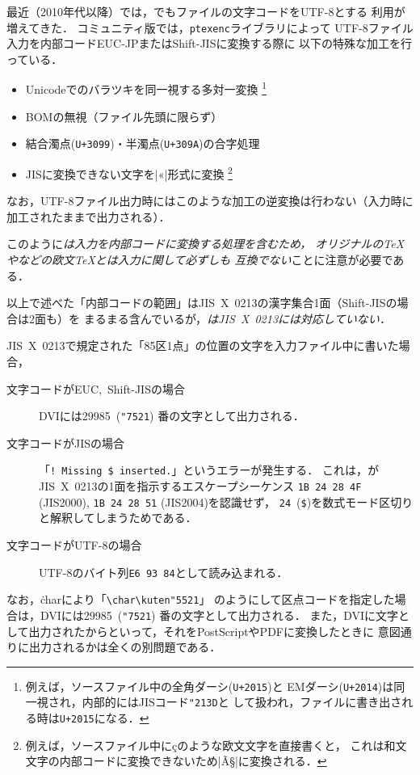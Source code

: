 \documentclass[a4paper,11pt,nomag,dvipdfmx]{jsarticle}
\def\code#1{\texttt{#1}}
\begin{document}
最近（2010年代以降）では，\pTeX でもファイルの文字コードをUTF-8とする
利用が増えてきた．
コミュニティ版\pTeX では，\code{ptexenc}ライブラリによって
UTF-8ファイル入力を内部コードEUC-JPまたはShift-JISに変換する際に
以下の特殊な加工を行っている．
\begin{itemize}
 \item Unicodeでのバラツキを同一視する多対一変換
  \footnote{例えば，ソースファイル中の全角ダーシ(\code{U+2015})と
  EMダーシ(\code{U+2014})は同一視され，内部的にはJISコード\code{"213D}と
  して扱われ，ファイルに書き出される時は\code{U+2015}になる．}
 \item BOMの無視（ファイル先頭に限らず）
 \item 結合濁点(\code{U+3099})・半濁点(\code{U+309A})の合字処理
 \item JISに変換できない文字を|^^ab|形式に変換
  \footnote{例えば，ソースファイル中にçのような欧文文字を直接書くと，
  これは和文文字の内部コードに変換できないため|^^c3^^a7|に変換される．}
\end{itemize}
なお，UTF-8ファイル出力時にはこのような加工の逆変換は行わない（入力時に
加工されたままで出力される）．

このように\emph{\pTeX は入力を内部コードに変換する処理を含むため，
オリジナルの\TeX や\pdfTeX などの欧文\TeX とは入力に関して必ずしも
互換でない}ことに注意が必要である．

\begin{dangerous}
 以上で述べた「内部コードの範囲」はJIS~X~0213の漢字集合1面（Shift-JISの場合は2面も）を
 まるまる含んでいるが，\emph{\pTeX はJIS~X~0213には対応していない．}

 JIS~X~0213で規定された「85区1点」の位置の文字を入力ファイル中に書いた場合，
 \begin{description}
  \item[文字コードがEUC,~Shift-JISの場合] DVIには29985~(\texttt{"7521})%
    番の文字として出力される．
  \item[文字コードがJISの場合] 「\verb+! Missing $ inserted.+」というエラーが発生する．
    これは，\pTeX がJIS~X~0213の1面を指示するエスケープシーケンス
    \texttt{1B 24 28 4F} (JIS2000), \texttt{1B 24 28 51} (JIS2004)を認識せず，
    \texttt{24}~(\texttt{\$})を数式モード区切りと解釈してしまうためである．
  \item[文字コードがUTF-8の場合] UTF-8のバイト列\texttt{E6 93 84}として読み込まれる．
 \end{description}
 なお，\.{char}により「\verb+\char\kuten"5521+」%
 のようにして区点コードを指定した場合は，DVIには29985~(\texttt{"7521})%
 番の文字として出力される．
 また，DVIに文字として出力されたからといって，それをPostScriptやPDFに変換したときに
 意図通りに出力されるかは全くの別問題である．
\end{dangerous}
\end{document}
